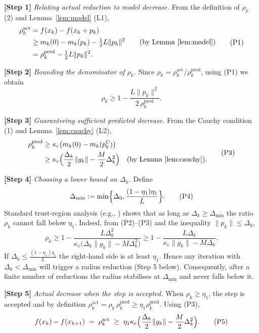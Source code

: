 \documentclass{article}
\begin{document}
\medskip
\noindent\textbf{[Step 1]} \emph{Relating actual reduction to model decrease.}  
From the definition of $\rho_{k}$ (2) and Lemma~\ref{lem:model} (L1),
\[
\begin{aligned}
\rho^{\mathrm{act}}_{k}
&= f(x_{k})-f(x_{k}+p_{k})
   \\
&\ge m_{k}(0)-m_{k}(p_{k}) - \tfrac12 L\|p_{k}\|^{2}
   \qquad\text{(by Lemma~\ref{lem:model})}\\
&= \rho^{\mathrm{pred}}_{k} - \tfrac12 L\|p_{k}\|^{2}.
\end{aligned}
\tag{P1}
\]

\noindent\textbf{[Step 2]} \emph{Bounding the denominator of $\rho_{k}$.}  
Since $\rho_{k}= \rho^{\mathrm{act}}_{k}/\rho^{\mathrm{pred}}_{k}$,
using (P1) we obtain
\[
\rho_{k}
\ge 1 - \frac{L\|p_{k}\|^{2}}{2\,\rho^{\mathrm{pred}}_{k}} .
\tag{P2}
\]

\noindent\textbf{[Step 3]} \emph{Guaranteeing sufficient predicted decrease.}  
From the Cauchy condition (1) and Lemma~\ref{lem:cauchy} (L2),
\[
\begin{aligned}
\rho^{\mathrm{pred}}_{k}
&\ge \kappa_{\mathrm{c}}\bigl(m_{k}(0)-m_{k}(p^{\mathrm{C}}_{k})\bigr)\\
&\ge \kappa_{\mathrm{c}}\Bigl(\frac{\Delta_{k}}{2}\|g_{k}\|- \frac{M}{2}\Delta_{k}^{2}\Bigr)
\quad\text{(by Lemma~\ref{lem:cauchy})}.
\end{aligned}
\tag{P3}
\]

\noindent\textbf{[Step 4]} \emph{Choosing a lower bound on $\Delta_{k}$.}  
Define
\[
\Delta_{\min}:= \min\Bigl\{\Delta_{0},
\frac{(1-\eta_{1})\eta_{1}}{L}\Bigr\}.
\tag{P4}
\]
Standard trust‑region analysis (e.g., \cite{Conn2000}) shows that
as long as $\Delta_{k}\ge\Delta_{\min}$ the ratio $\rho_{k}$ cannot fall below
$\eta_{1}$.  Indeed, from (P2)–(P3) and the inequality $\|p_{k}\|\le\Delta_{k}$,
\[
\rho_{k}\ge
1-\frac{L\Delta_{k}^{2}}
      { \kappa_{\mathrm{c}} \bigl(\Delta_{k}\|g_{k}\| - M\Delta_{k}^{2}\bigr)}
\ge 1-\frac{L\Delta_{k}}{\kappa_{\mathrm{c}}\|g_{k}\| - M\Delta_{k}} .
\]
If $\Delta_{k}\le\frac{(1-\eta_{1})\eta_{1}}{L}$ the right‑hand side is at least
$\eta_{1}$.  Hence any iteration with $\Delta_{k}<\Delta_{\min}$ will trigger a
radius reduction (Step 5 below).  Consequently, after a finite number of
reductions the radius stabilises at $\Delta_{\min}$ and never falls below it.

\noindent\textbf{[Step 5]} \emph{Actual decrease when the step is accepted.}  
When $\rho_{k}\ge\eta_{1}$, the step is accepted and by definition
$\rho^{\mathrm{act}}_{k}= \rho_{k}\,\rho^{\mathrm{pred}}_{k}\ge\eta_{1}\rho^{\mathrm{pred}}_{k}$.
Using (P3),
\[
f(x_{k})-f(x_{k+1})
\;=\;\rho^{\mathrm{act}}_{k}
\;\ge\;\eta_{1}\kappa_{\mathrm{c}}
\Bigl(\frac{\Delta_{k}}{2}\|g_{k}\|- \frac{M}{2}\Delta_{k}^{2}\Bigr).
\tag{P5}
\]
\end{document}
